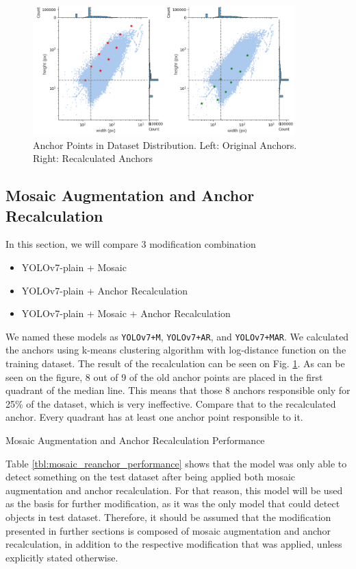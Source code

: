 \documentclass[conference]{IEEEtran}
\begin{document}
\begin{figure}
\centerline{\includegraphics[width=0.9\textwidth]{../book/figures/anchor-dist-2.png}}
\caption{Anchor Points in Dataset Distribution. Left: Original Anchors. Right: Recalculated Anchors}
\label{fig:anchor-recalculated}
\end{figure}

\subsection{Mosaic Augmentation and Anchor Recalculation}
In this section, we will compare 3 modification combination
\begin{itemize}
    \item YOLOv7-plain + Mosaic
    \item YOLOv7-plain + Anchor Recalculation
    \item YOLOv7-plain + Mosaic + Anchor Recalculation
\end{itemize}
We named these models as \verb|YOLOv7+M|, \verb|YOLOv7+AR|, and \verb|YOLOv7+MAR|.
We calculated the anchors using k-means clustering algorithm with log-distance function on the
training dataset. The result of the recalculation can be seen on Fig. \ref{fig:anchor-recalculated}.
As can be seen on the figure, 8 out of 9 of the old anchor points are placed in the first quadrant
of the median line. This means that those 8 anchors responsible only for 25\% of the dataset, which
is very ineffective. Compare that to the recalculated anchor. Every quadrant has at least one anchor
point responsible to it.
\begin{table}[htbp]
  \centering
  \caption{Mosaic Augmentation and Anchor Recalculation Performance}
  \label{tbl:mosaic_reanchor_performance}
  \vspace{-1ex}
  
\end{table}

Table \ref{tbl:mosaic_reanchor_performance} shows that the model was only able
to detect something on the test dataset after being applied both mosaic augmentation
and anchor recalculation.
For that reason, this model will be used as the basis for further 
modification, as it was the only model that could detect objects in test dataset.
Therefore, it should be assumed that the modification presented in
further sections is composed of mosaic augmentation and anchor recalculation, 
in addition to the respective modification that was applied, unless explicitly stated otherwise.
\end{document}
